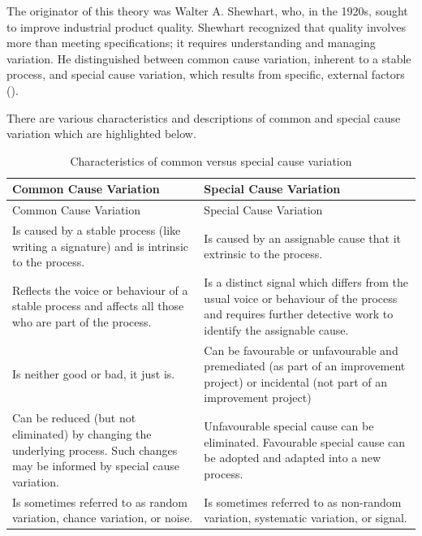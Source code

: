 \documentclass[
]{book}
\begin{document}
The originator of this theory was Walter A. Shewhart, who, in the 1920s, sought to improve industrial product quality. Shewhart recognized that quality involves more than meeting specifications; it requires understanding and managing variation. He distinguished between common cause variation, inherent to a stable process, and special cause variation, which results from specific, external factors ().

There are various characteristics and descriptions of common and special cause variation which are highlighted below.

\begin{longtable}[]{@{}
  >{\raggedright\arraybackslash}p{}
  >{\raggedright\arraybackslash}p{}@{}}
\caption{Characteristics of common versus special cause variation}\tabularnewline
\toprule\noalign{}
\begin{minipage}[b]{\linewidth}\raggedright
Common Cause Variation
\end{minipage} & \begin{minipage}[b]{\linewidth}\raggedright
Special Cause Variation
\end{minipage} \\
\midrule\noalign{}
\endfirsthead
\toprule\noalign{}
\begin{minipage}[b]{\linewidth}\raggedright
Common Cause Variation
\end{minipage} & \begin{minipage}[b]{\linewidth}\raggedright
Special Cause Variation
\end{minipage} \\
\midrule\noalign{}
\endhead
\bottomrule\noalign{}
\endlastfoot
Is caused by a stable process (like
writing a signature) and is intrinsic
to the process. & Is caused by an assignable cause that
it extrinsic to the process. \\
Reflects the voice or behaviour of a
stable process and affects all those
who are part of the process. & Is a distinct signal which differs
from the usual voice or behaviour of
the process and requires further
detective work to identify the
assignable cause. \\
Is neither good or bad, it just is. & Can be favourable or unfavourable and
premediated (as part of an improvement
project) or incidental (not part of an
improvement project) \\
Can be reduced (but not eliminated) by
changing the underlying process.
Such changes may be informed by
special cause variation. & Unfavourable special cause can be
eliminated. Favourable special cause
can be adopted and adapted into a new
process. \\
Is sometimes referred to as random
variation, chance variation, or noise. & Is sometimes referred to as non-random
variation, systematic variation, or
signal. \\
\end{longtable}
\end{document}
